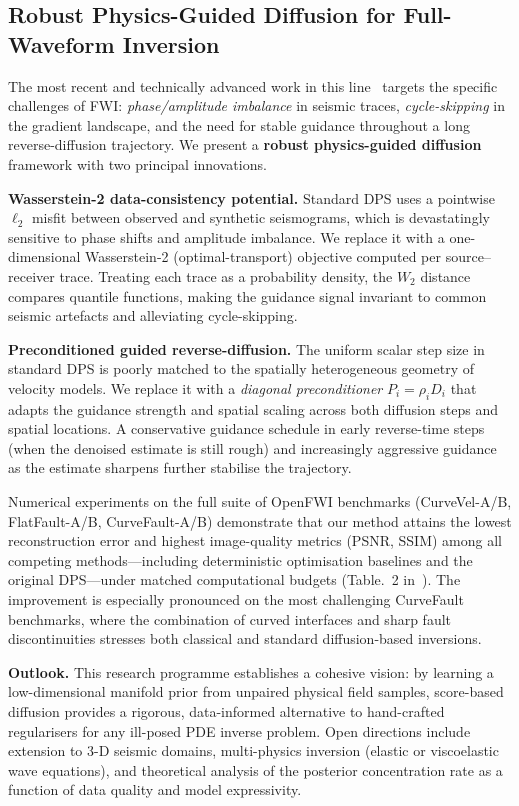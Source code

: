 \subsection{Robust Physics-Guided Diffusion for Full-Waveform Inversion}

The most recent and technically advanced work in this line~\cite{Peng2026} targets
the specific challenges of FWI: \emph{phase/amplitude imbalance} in seismic traces,
\emph{cycle-skipping} in the gradient landscape, and the need for stable guidance
throughout a long reverse-diffusion trajectory.  We present a \textbf{robust
physics-guided diffusion} framework with two principal innovations.

\textbf{Wasserstein-2 data-consistency potential.}  Standard DPS uses a pointwise
$\ell_{2}$ misfit between observed and synthetic seismograms, which is devastatingly
sensitive to phase shifts and amplitude imbalance.  We replace it with a
one-dimensional Wasserstein-2 (optimal-transport) objective computed per
source--receiver trace.  Treating each trace as a probability density, the $W_2$
distance compares quantile functions, making the guidance signal
invariant to common seismic artefacts and alleviating cycle-skipping.

\textbf{Preconditioned guided reverse-diffusion.}  The uniform scalar step size in
standard DPS is poorly matched to the spatially heterogeneous geometry of velocity
models.  We replace it with a \emph{diagonal preconditioner} $P_{i} = \rho_{i}D_{i}$
that adapts the guidance strength and spatial scaling across both diffusion steps and
spatial locations.  A conservative guidance schedule in early reverse-time steps (when
the denoised estimate is still rough) and increasingly aggressive guidance as the
estimate sharpens further stabilise the trajectory.

Numerical experiments on the full suite of OpenFWI benchmarks (CurveVel-A/B,
FlatFault-A/B, CurveFault-A/B) demonstrate that our method attains the lowest
reconstruction error and highest image-quality metrics (PSNR, SSIM) among all
competing methods---including deterministic optimisation baselines and the original
DPS---under matched computational budgets (Table.~2 in~\cite{Peng2026}). The
improvement is especially pronounced on the most challenging CurveFault benchmarks,
where the combination of curved interfaces and sharp fault discontinuities stresses
both classical and standard diffusion-based inversions.

\bigskip
\noindent\textbf{Outlook.}  This research programme establishes a cohesive vision:
by learning a low-dimensional manifold prior from unpaired physical field samples,
score-based diffusion provides a rigorous, data-informed alternative to hand-crafted
regularisers for any ill-posed PDE inverse problem.  Open directions include extension
to 3-D seismic domains, multi-physics inversion (elastic or viscoelastic wave
equations), and theoretical analysis of the posterior concentration rate as a function
of data quality and model expressivity.
